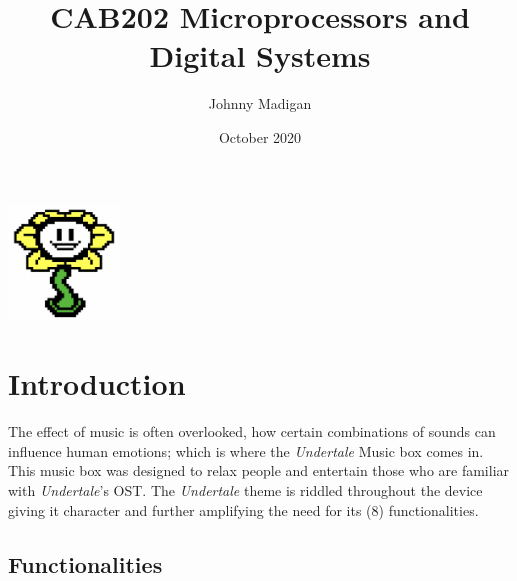 \documentclass[a4paper]{article}
\title{CAB202 Microprocessors and Digital Systems\vspace{-3ex}}
\author{Johnny Madigan}
\date{\vspace{-3ex}October 2020\vspace{20ex}}
\begin{document}
\maketitle
\begin{center}
\includegraphics[width=3cm]{flower.png}
\end{center}
\newpage
\tableofcontents
\newpage

\section{Introduction}\label{sec:introduction}
\par The effect of music is often overlooked, how certain combinations of sounds can influence human emotions; which is where the \emph{Undertale} Music box comes in. This music box was designed to relax people and entertain those who are familiar with \emph{Undertale}'s OST. The \emph{Undertale} theme is riddled throughout the device giving it character and further amplifying the need for its (8) functionalities.

\subsection{Functionalities}
\end{document}
